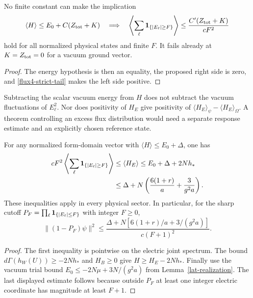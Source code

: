 \begin{corollary}
\label{flux4-failed-relative-budget}
No finite constant can make the implication
\begin{equation}
 \langle H\rangle\le E_0+C(Z_{\rm tot}+K)\quad\Longrightarrow\quad
 \left\langle\sum_\ell{\bf1}_{\{|E_\ell|\ge F\}}\right\rangle
 \le\frac{C'(Z_{\rm tot}+K)}{cF^2}
 \label{flux4-false-budget}
\end{equation}
hold for all normalized physical states and finite $F$.  It fails
already at $K=Z_{\rm tot}=0$ for a vacuum ground vector.
\end{corollary}
\begin{proof}
The energy hypothesis is then an equality, the proposed right side
is zero, and \eqref{flux4-strict-tail} makes the left side positive.
\end{proof}

Subtracting the scalar vacuum energy from $H$ does not subtract the
vacuum fluctuations of $E_\ell^2$.  Nor does positivity of $H_E$ give
positivity of $\langle H_E\rangle_\psi-\langle H_E\rangle_\Omega$.
A theorem controlling an excess flux distribution would need a
separate response estimate and an explicitly chosen reference state.

\begin{lemma}
\label{flux4-volume-budget}
For any normalized form-domain vector with
$\langle H\rangle\le E_0+\Delta$, one has
\begin{align}
 cF^2\left\langle\sum_\ell
       {\bf1}_{\{|E_\ell|\ge F\}}\right\rangle
 &\le \langle H_E\rangle
 \le E_0+\Delta+2Nh_* \notag\\
 &\le \Delta+N\left(\frac{6(1+r)}a+\frac3{g^2a}\right).
 \label{flux4-volume-budget-eq}
\end{align}
These inequalities apply in every physical sector.  In particular,
for the sharp cutoff
$P_F=\prod_\ell{\bf1}_{\{|E_\ell|\le F\}}$ with integer $F\ge0$,
\begin{equation}
 \|(1-P_F)\psi\|^2
 \le\frac{\Delta+N[6(1+r)/a+3/(g^2a)]}{c(F+1)^2}.
 \label{flux4-outside-probability}
\end{equation}
\end{lemma}
\begin{proof}
The first inequality is pointwise on the electric joint spectrum.
The bound $d\Gamma(h_W(U))\ge-2Nh_*$ and $H_B\ge0$ give
$H\ge H_E-2Nh_*$.  Finally use the vacuum trial bound
$E_0\le-2N\mu+3N/(g^2a)$ from Lemma~\ref{lat-realization}.
The last displayed estimate follows because outside $P_F$ at least
one integer electric coordinate has magnitude at least $F+1$.
\end{proof}

